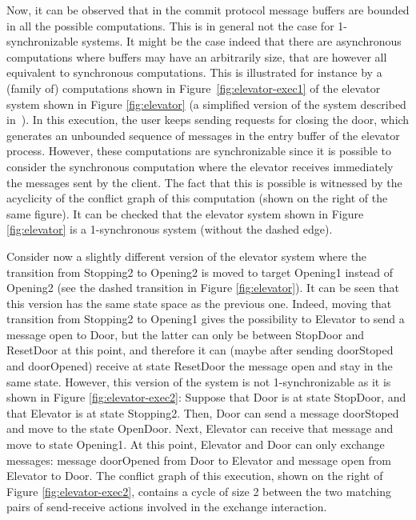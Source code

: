 Now, it can be observed that in the commit protocol message buffers are bounded in all the possible computations. This is in general not the case for 1-synchronizable systems. It might be the case indeed that there are asynchronous computations where buffers may have an arbitrarily size, that are however all equivalent to synchronous computations. This is illustrated for instance by a (family of) computations shown in Figure~\ref{fig:elevator-exec1} of the elevator system shown in Figure \ref{fig:elevator} (a simplified version of the system described in~\cite{DBLP:conf/pldi/DesaiGJQRZ13}).  In this execution, the user keeps sending requests for closing the door, which generates an unbounded sequence of messages in the entry buffer of the elevator process. However, these computations are synchronizable since it is possible to consider the synchronous computation where the elevator receives immediately the messages sent by the client. The fact that this is possible is witnessed by the acyclicity of the conflict graph of this computation (shown on the right of the same figure). It can be checked that the elevator system shown in Figure \ref{fig:elevator} is a 1-synchronous system (without the dashed edge). 

Consider now a slightly different version of the elevator system where the transition from {\sf Stopping2} to {\sf Opening2} is moved to target {\sf Opening1} instead of {\sf Opening2} (see the dashed transition in Figure \ref{fig:elevator}). It can be seen that this version has the same state space as the previous one. Indeed, moving that transition from {\sf Stopping2} to {\sf Opening1} gives the possibility to {\sf Elevator} to send a message open to {\sf Door}, but the latter can only be between {\sf StopDoor} and {\sf ResetDoor} at this point, and therefore it can (maybe after sending {\sf doorStoped} and {\sf doorOpened}) receive at state {\sf ResetDoor} the message {\sf open} and stay in the same state. However, this version of the system is not 1-synchronizable as it is shown in Figure \ref{fig:elevator-exec2}: Suppose that {\sf Door} is at state {\sf StopDoor}, and that {\sf Elevator} is at state {\sf Stopping2}. Then, {\sf Door} can send a message {\sf doorStoped} and move to the state {\sf OpenDoor}. Next, {\sf Elevator} can receive that message and move to state {\sf Opening1}. At this point, {\sf Elevator} and {\sf Door} can only exchange messages: message {\sf doorOpened} from {\sf Door} to {\sf Elevator} and message {\sf open} from {\sf Elevator} to {\sf Door}. The conflict graph of this execution, shown on the right of Figure \ref{fig:elevator-exec2}, contains a cycle of size 2 between the two matching pairs of send-receive actions involved in the exchange interaction. 

